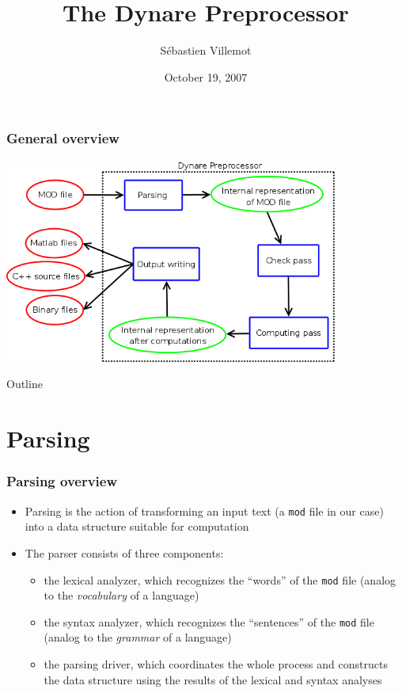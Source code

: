 \documentclass{beamer}
\title{The Dynare Preprocessor}
\author[S. Villemot]{Sébastien Villemot}
\institute{CEPREMAP}
\date{October 19, 2007}
\begin{document}
\begin{frame}
  \titlepage
\end{frame}

\begin{frame}
  \frametitle{General overview}
  \begin{center}
    \includegraphics[width=11cm]{overview.png}
  \end{center}
\end{frame}

\begin{frame}{Outline}
  \tableofcontents
\end{frame}

\section{Parsing}

\begin{frame}
\frametitle{Parsing overview}
\begin{itemize}
\item Parsing is the action of transforming an input text (a \texttt{mod} file in our case) into a data structure suitable for computation
\item The parser consists of three components:
  \begin{itemize}
  \item the \alert{lexical analyzer}, which recognizes the ``words'' of the \texttt{mod} file (analog to the \textit{vocabulary} of a language)
  \item the \alert{syntax analyzer}, which recognizes the ``sentences'' of the \texttt{mod} file (analog to the \textit{grammar} of a language)
  \item the \alert{parsing driver}, which coordinates the whole process and constructs the data structure using the results of the lexical and syntax analyses
  \end{itemize}
\end{itemize}
\end{frame}
\end{document}
